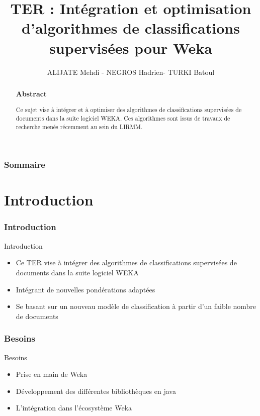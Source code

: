 \documentclass[12pt]{beamer}
\author{ALIJATE Mehdi -  NEGROS Hadrien- TURKI Batoul}
\title{TER :  Intégration et optimisation d’algorithmes de classifications supervisées pour Weka
}
\institute{Université Montpellier 2 - LIRMM}
\begin{document}
\begin{frame}
\titlepage 
\end{frame}

\begin{frame}
\begin{abstract}
\frametitle{Abstract}
\begin{center}
Ce sujet vise à intégrer et à optimiser des algorithmes de classifications supervisées de documents dans la suite logiciel WEKA. Ces algorithmes sont issus de travaux de recherche menés récemment au sein du LIRMM.
\end{center}
\end{abstract}
\end{frame}

\begin{frame}
\tableofcontents
\frametitle{Sommaire}


\end{frame}

\section{Introduction}

\begin{frame}
\frametitle{Introduction}
\begin{block}{Introduction}
\begin{itemize}
\item Ce TER vise à intégrer des algorithmes de classifications supervisées de documents dans la suite logiciel WEKA 
\item Intégrant de nouvelles pondérations adaptées
\item Se basant sur un nouveau modèle de classification à partir d’un faible nombre de documents
\end{itemize} 
\end{block}
\end{frame}

\begin{frame}
\frametitle{Besoins}
\begin{block}{Besoins}
\begin{itemize}
\item Prise en main de Weka
\item Développement des différentes bibliothèques en java
\item L'intégration dans l’écosystème Weka
\end{itemize}
\end{block}

\end{frame}
\end{document}

